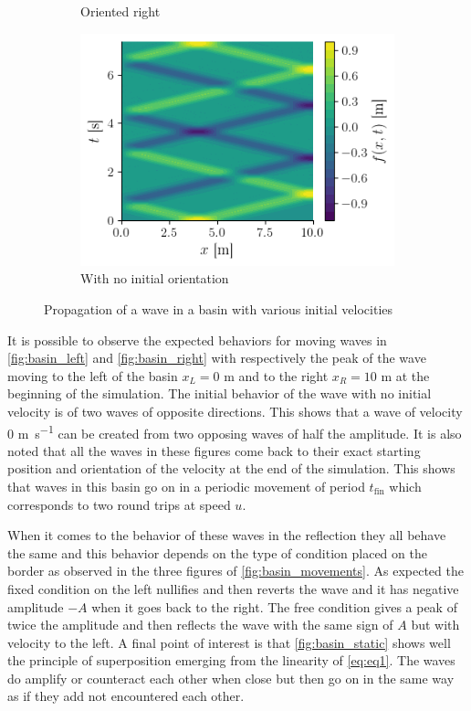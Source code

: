 \begin{figure}[h]
\begin{subfigure}{0.48\linewidth}
        \caption{Oriented right}
        \label{fig:basin_right}
    \end{subfigure}
    \begin{subfigure}{0.48\linewidth}
        \includegraphics[width=\linewidth]{figures/bassin_default_static.png}
        \caption{With no initial orientation}
        \label{fig:basin_static}
    \end{subfigure}
    \caption{Propagation of a wave in a basin with various initial velocities}
    \label{fig:basin_movements}
\end{figure}

It is possible to observe the expected behaviors for moving waves in \autoref{fig:basin_left} and \autoref{fig:basin_right} with respectively the peak of the wave moving to the left of the basin $x_L = 0$ \si{\meter} and to the right $x_R = 10$ \si{\meter} at the beginning of the simulation. The initial behavior of the wave with no initial velocity is of two waves of opposite directions. This shows that a wave of velocity 0 \si{\meter\per\second} can be created from two opposing waves of half the amplitude. It is also noted that all the waves in these figures come back to their exact starting position and orientation of the velocity at the end of the simulation. This shows that waves in this basin go on in a periodic movement of period $t_\mathrm{fin}$ which corresponds to two round trips at speed $u$.

When it comes to the behavior of these waves in the reflection they all behave the same and this behavior depends on the type of condition placed on the border as observed in the three figures of \autoref{fig:basin_movements}. As expected the fixed condition on the left nullifies and then reverts the wave and it has negative amplitude $-A$ when it goes back to the right. The free condition gives a peak of twice the amplitude and then reflects the wave with the same sign of $A$ but with velocity to the left. A final point of interest is that \autoref{fig:basin_static} shows well the principle of superposition emerging from the linearity of \autoref{eq:eq1}. The waves do amplify or counteract each other when close but then go on in the same way as if they add not encountered each other.


